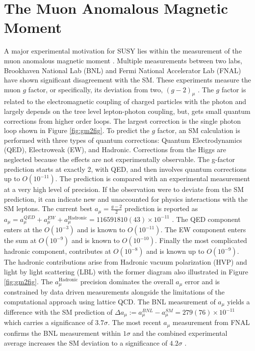 \section{The Muon Anomalous Magnetic Moment}

A major experimental motivation for SUSY lies within the measurement of the muon anomalous magnetic moment \cite{Bagnaschi:2022qhb}.  Multiple measurements between two labs, Brookhaven National Lab (BNL) and Fermi National Accelerator Lab (FNAL) have shown significant disagreement with the SM. These experiments measure the muon $g$ factor, or specifically, its deviation from two, $(g-2)_\mu$ .  The $g$ factor is related to the electromagnetic coupling of charged particles with the photon and largely depends on the tree level lepton-photon coupling, but, gets small quantum corrections from higher order loops. The largest correction is the single photon loop shown in Figure \ref{fig:gm2fig}. To predict the $g$ factor, an SM calculation is performed with three types of quantum corrections: Quantum Electrodynamics (QED), Electroweak (EW), and Hadronic. Corrections from the Higgs are neglected because the effects are not experimentally observable. %
The g-factor prediction starts at exactly 2, with QED, and then involves quantum corrections up to $O(10^{-11})$. The prediction is compared with an experimental measurement at a very high level of precision. If the observation were to deviate from the SM prediction, it can indicate new and unaccounted for physics interactions with the SM leptons.
The current best $a_\mu = \frac{g-2}{2}$ prediction is reported as $a_\mu= a_\mu^{QED}+ a_\mu^{EW}+a_\mu^{\text{Hadronic}} =  116 591 810(43) \times 10^{-11}$ \cite{Muong-2:2021ojo}.
The QED component enters at the $O(10^{-3})$ and is known to $O(10^{-11})$. The EW component enters the sum at $O(10^{-9})$ and is known to $O(10^{-10})$. Finally the most complicated hadronic component, contributes at $O(10^{-8})$ and is known up to $O(10^{-9})$. The hadronic contributions arise from Hadronic vacuum polarization (HVP) and light by light scattering (LBL) with the former diagram also illustrated in Figure \ref{fig:gm2fig}. The $a_\mu^{\text{Hadronic}}$ precision dominates the overall $a_\mu$ error and is constrained by data driven measurements alongside the limitations of the computational approach using lattice QCD. The BNL measurement of $a_\mu$ yields a difference with the SM prediction of $\Delta a_\mu := a_\mu^{BNL} - a_\mu^{SM} = 279(76) \times 10^{-11}$ which carries a significance of $3.7\sigma$. The most recent $a_\mu$ measurement from FNAL confirms the BNL measurement within $1\sigma$ and the combined experimental average increases the SM deviation to a significance of $4.2\sigma$ \cite{Muong-2:2021ojo}.


